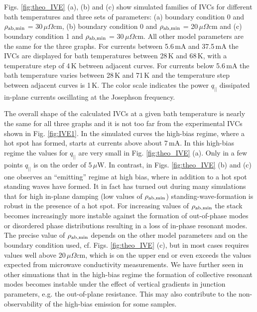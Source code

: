 \documentclass[aps,twocolumn,prb,showpacs,preprintnumbers,superscriptaddress,amsmath,amssymb,longbibliography]{revtex4-1}
\begin{document}
Figs. \ref{fig:theo_IVE} (a), (b) and (c) show simulated families of IVCs for different bath temperatures and three sets of parameters: (a) boundary condition 0 and $\rho_{\rm {ab,min}}$ = 30\,$\mu\Omega$cm, (b) boundary condition 0 and $\rho_{\rm {ab,min}}$ = 20\,$\mu\Omega$cm and (c) boundary condition 1 and $\rho_{\rm {ab,min}}$ = 30\,$\mu\Omega$cm. All  other model parameters are the same for the three graphs. For currents between 5.6\,mA and 37.5\,mA the IVCs are displayed for bath temperatures between 28\,K and 68\,K, with a temperature step of 4\,K between adjacent curves. For currents below 5.6\,mA the bath temperature varies between 28\,K and 71\,K and the temperature step between adjacent curves is 1\,K. The color scale indicates the power $q_{||}$ dissipated in-plane currents oscillating at the Josephson frequency. 

The overall shape of the calculated IVCs at a given bath temperature is nearly the same for all three graphs and it is not too far from the experimental IVCs shown in Fig. \ref{fig:IVE1}. In the simulated curves the high-bias regime, where a hot spot has formed, starts at currents above about 7\,mA. In this high-bias regime the values for $q_{||}$ are very small in Fig. \ref{fig:theo_IVE} (a). Only in a few points $q_{||}$ is on the order of 5\,$\mu$W. In contrast, in Figs. \ref{fig:theo_IVE} (b) and (c) one observes an ``emitting'' regime at high bias, where in addition to a hot spot standing waves have formed. It in fact has turned out during many simulations that for high in-plane damping (low values of $\rho_{\rm {ab,min}}$) standing-wave-formation is robust in the presence of a hot spot. For increasing values of $\rho_{\rm {ab,min}}$ the stack becomes increasingly more instable against the formation of out-of-phase modes or disordered phase distributions resulting in a loss of in-phase resonant modes. The precise value of $\rho_{\rm {ab,min}}$ depends on the other model parameters and on the boundary condition used, cf. Figs. \ref{fig:theo_IVE} (c), but in most cases requires values well above 20\,$\mu\Omega$cm, which is on the upper end or even exceeds the values expected from microwave conductivity measurements. We have further seen in other simuations that in the high-bias regime the formation of collective resonant modes becomes instable under the effect of vertical gradients in junction parameters, e.g. the out-of-plane resistance. This may also contribute to the non-observability of the high-bias emission for some samples.
\end{document}
